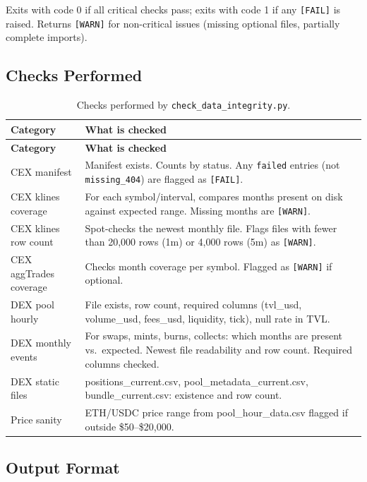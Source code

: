 \documentclass[11pt,a4paper]{article}
\begin{document}
Exits with code 0 if all critical checks pass; exits with code 1 if any \texttt{[FAIL]} is raised. Returns \texttt{[WARN]} for non-critical issues (missing optional files, partially complete imports).

\subsection{Checks Performed}

\begin{longtable}{L{4.0cm}L{10.4cm}}
\caption{Checks performed by \texttt{check\_data\_integrity.py}.}\\
\toprule
\textbf{Category} & \textbf{What is checked} \\
\midrule
\endfirsthead
\toprule
\textbf{Category} & \textbf{What is checked} \\
\midrule
\endhead
\bottomrule
\endfoot
CEX manifest & Manifest exists. Counts by status. Any \texttt{failed} entries (not \texttt{missing\_404}) are flagged as \texttt{[FAIL]}. \\
CEX klines coverage & For each symbol/interval, compares months present on disk against expected range. Missing months are \texttt{[WARN]}. \\
CEX klines row count & Spot-checks the newest monthly file. Flags files with fewer than 20,000 rows (1m) or 4,000 rows (5m) as \texttt{[WARN]}. \\
CEX aggTrades coverage & Checks month coverage per symbol. Flagged as \texttt{[WARN]} if optional. \\
DEX pool hourly & File exists, row count, required columns (tvl\_usd, volume\_usd, fees\_usd, liquidity, tick), null rate in TVL. \\
DEX monthly events & For swaps, mints, burns, collects: which months are present vs.\ expected. Newest file readability and row count. Required columns checked. \\
DEX static files & positions\_current.csv, pool\_metadata\_current.csv, bundle\_current.csv: existence and row count. \\
Price sanity & ETH/USDC price range from pool\_hour\_data.csv flagged if outside \$50--\$20,000. \\
\end{longtable}

\subsection{Output Format}
\end{document}
